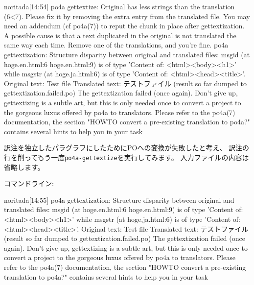 \documentclass[mingoth,a4paper]{jsarticle}
\begin{document}
\begin{commandline}
noritada[14:54]%
po4a gettextize: Original has less strings than the translation (6<7). Please 
               fix it by removing the extra entry from the translated file. You 
               may need an addendum (cf po4a(7)) to reput the chunk in place 
               after gettextization. A possible cause is that a text duplicated 
               in the original is not translated the same way each time. Remove 
               one of the translations, and you're fine.
po4a gettextization: Structure disparity between original and translated files:
msgid (at hoge.en.html:6 hoge.en.html:9) is of type 'Content of: 
<html><body><h1>' while
msgstr (at hoge.ja.html:6) is of type 'Content of: <html><head><title>'.
Original text: Test file
Translated text: テストファイル
(result so far dumped to gettextization.failed.po)
The gettextization failed (once again). Don't give up, gettextizing is a subtle 
art, but this is only needed once to convert a project to the gorgeous luxus 
offered by po4a to translators.
Please refer to the po4a(7) documentation, the section "HOWTO convert a 
pre-existing translation to po4a?" contains several hints to help you in your 
task
\end{commandline}

訳注を独立したパラグラフにしたためにPOへの変換が失敗したと考え、
訳注の行を削ってもう一度\texttt{po4a-gettextize}を実行してみます。
入力ファイルの内容は省略します。

コマンドライン:

\begin{commandline}
noritada[14:55]%
po4a gettextization: Structure disparity between original and translated files:
msgid (at hoge.en.html:6 hoge.en.html:9) is of type 'Content of: 
<html><body><h1>' while
msgstr (at hoge.ja.html:6) is of type 'Content of: <html><head><title>'.
Original text: Test file
Translated text: テストファイル
(result so far dumped to gettextization.failed.po)
The gettextization failed (once again). Don't give up, gettextizing is a subtle 
art, but this is only needed once to convert a project to the gorgeous luxus 
offered by po4a to translators.
Please refer to the po4a(7) documentation, the section "HOWTO convert a 
pre-existing translation to po4a?" contains several hints to help you in your 
task
\end{commandline}
\end{document}
